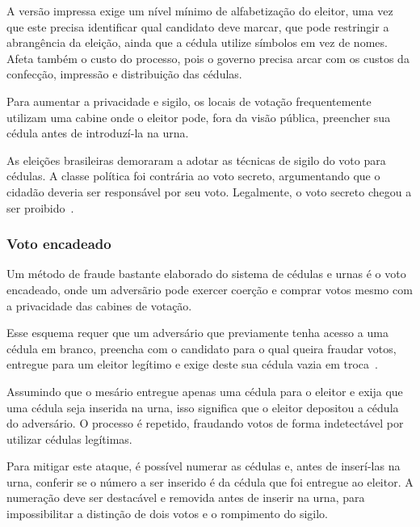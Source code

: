 A versão impressa exige um nível mínimo de alfabetização do eleitor, uma vez
que este precisa identificar qual candidato deve marcar, que pode restringir a
abrangência da eleição, ainda que a cédula utilize símbolos em vez de nomes.
Afeta também o custo do processo, pois o governo precisa arcar com os custos da
confecção, impressão e distribuição das cédulas.

Para aumentar a privacidade e sigilo, os locais de votação frequentemente
utilizam uma cabine onde o eleitor pode, fora da visão pública, preencher sua
cédula antes de introduzí-la na urna.

As eleições brasileiras demoraram a adotar as técnicas de sigilo do voto para
cédulas. A classe política foi contrária ao voto secreto, argumentando que o
cidadão deveria ser responsável por seu voto. Legalmente, o voto secreto chegou
a ser proibido~\cite{nicolau2012eleicoes}.

\subsubsection{Voto encadeado}

Um método de fraude bastante elaborado do sistema de cédulas e urnas é o voto
encadeado, onde um adversãrio pode exercer coerção e comprar votos mesmo com a
privacidade das cabines de votação.

Esse esquema requer que um adversário que previamente tenha acesso a uma cédula
em branco, preencha com o candidato para o qual queira fraudar votos, entregue
para um eleitor legítimo e exige deste sua cédula vazia em
troca~\cite{jones2012broken}.

Assumindo que o mesário entregue apenas uma cédula para o eleitor e exija que
uma cédula seja inserida na urna, isso significa que o eleitor depositou a
cédula do adversário. O processo é repetido, fraudando votos de forma
indetectável por utilizar cédulas legítimas.

Para mitigar este ataque, é possível numerar as cédulas e, antes de inserí-las
na urna, conferir se o número a ser inserido é da cédula que foi entregue ao
eleitor. A numeração deve ser destacável e removida antes de inserir na urna,
para impossibilitar a distinção de dois votos e o rompimento do sigilo.
